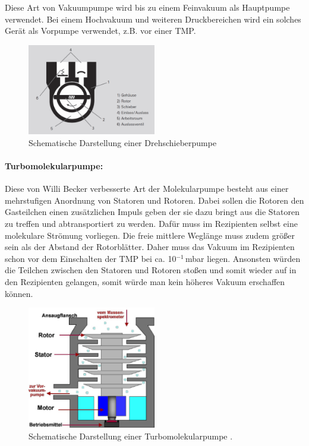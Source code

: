  Diese Art von Vakuumpumpe wird bis zu einem Feinvakuum als Hauptpumpe verwendet. Bei einem Hochvakuum und weiteren Druckbereichen wird
 ein solches Gerät als Vorpumpe verwendet, z.B. vor einer TMP.

 \begin{figure}
   \centering
   \includegraphics[width=0.5\textwidth]{Drehschieberpumpe.png}
   \caption{Schematische Darstellung einer Drehschieberpumpe \cite{DSP}}
   \label{fig:DSP}
 \end{figure}

 \paragraph{Turbomolekularpumpe:}
 Diese von Willi Becker verbesserte Art der Molekularpumpe besteht aus einer mehrstufigen Anordnung von Statoren und Rotoren. Dabei sollen die
 Rotoren den Gasteilchen einen zusätzlichen Impuls geben der sie dazu bringt aus die Statoren zu treffen und abtransportiert zu werden. Dafür
 muss im Rezipienten selbst eine molekulare Strömung vorliegen. Die freie mittlere Weglänge muss zudem größer sein als der Abstand der Rotorblätter.
 Daher muss das Vakuum im Rezipienten schon vor dem Einschalten der TMP bei ca. 10$^{-1}\,$mbar liegen. Ansonsten würden die Teilchen zwischen
 den Statoren und Rotoren stoßen und somit wieder auf in den Rezipienten gelangen, somit würde man kein höheres Vakuum erschaffen können.
\begin{figure}
  \centering
  \includegraphics[width=0.5\textwidth]{TMP.JPG}
  \caption{Schematische Darstellung einer Turbomolekularpumpe \cite{TMP}.}
  \label{fig:TMP}
\end{figure}
\FloatBarrier

